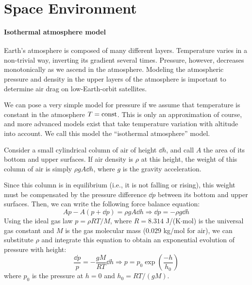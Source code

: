 \section[Space Environment]{Space Environment}
 
\paragraph{Isothermal atmosphere model}

Earth's atmosphere is composed of many different layers. Temperature varies in
a non-trivial way, inverting its gradient several times. Pressure, however,
decreases monotonically as we ascend in the atmosphere. Modeling the 
atmospheric pressure and density in the upper layers of the atmosphere is 
important to determine air drag on low-Earth-orbit satellites.

We can pose a very simple model for pressure if we assume that temperature is
constant in the atmosphere $T=\text{const}$. This is only an approximation of
course, and more advanced models exist that take temperature variation with
altitude into account. We call this model the ``isothermal atmosphere'' model.

Consider a small cylindrical column of air of height $\dd h$, and call $A$ the
area of its bottom and upper surfaces. If air density is $\rho$ at this height,
the weight of this column of air is simply $\rho g A \dd h$, where $g$ is 
the gravity acceleration.

Since this column is in equilibrium (i.e., it is not falling or rising), this
weight must be compensated by the pressure difference $\dd p$ between its
bottom  and upper surfaces. Then, we can write the following force balance
equation:
%
\begin{equation}
Ap - A(p+\dd p) = \rho g A \dd h \Rightarrow \dd p = -\rho g \dd h
\label{eq:atmforcebalance}
\end{equation}
%
Using the ideal gas law $p=\rho R T/M$, where $R=8.314$ J/(K$\cdot$mol) is the
universal gas constant and $M$ is the gas molecular mass ($0.029$ kg/mol for
air), we can substitute $\rho$ and integrate this equation to obtain an 
exponential evolution of pressure with height:
%
\begin{equation}
\frac{\dd p}{p} = - \frac{gM}{RT}  \dd h \Rightarrow 
p=p_0 \exp\left(\frac{-h}{h_0}\right)
\label{eq:exponentialatm}
\end{equation}
%
where $p_0$ is the pressure at $h=0$ and $h_0=RT/(gM)$.

